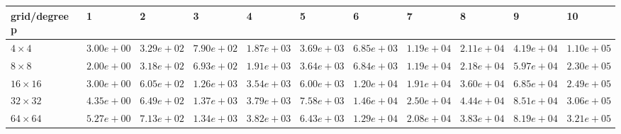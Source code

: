 \begin{tabular}{lllllllllll}
\hline
 grid/degree p   & 1          & 2          & 3          & 4          & 5          & 6          & 7          & 8          & 9          & 10         \\
\hline
 $4 \times 4$    & $3.00e+00$ & $3.29e+02$ & $7.90e+02$ & $1.87e+03$ & $3.69e+03$ & $6.85e+03$ & $1.19e+04$ & $2.11e+04$ & $4.19e+04$ & $1.10e+05$ \\
 $8 \times 8$    & $2.00e+00$ & $3.18e+02$ & $6.93e+02$ & $1.91e+03$ & $3.64e+03$ & $6.84e+03$ & $1.19e+04$ & $2.18e+04$ & $5.97e+04$ & $2.30e+05$ \\
 $16 \times 16$  & $3.00e+00$ & $6.05e+02$ & $1.26e+03$ & $3.54e+03$ & $6.00e+03$ & $1.20e+04$ & $1.91e+04$ & $3.60e+04$ & $6.85e+04$ & $2.49e+05$ \\
 $32 \times 32$  & $4.35e+00$ & $6.49e+02$ & $1.37e+03$ & $3.79e+03$ & $7.58e+03$ & $1.46e+04$ & $2.50e+04$ & $4.44e+04$ & $8.51e+04$ & $3.06e+05$ \\
 $64 \times 64$  & $5.27e+00$ & $7.13e+02$ & $1.34e+03$ & $3.82e+03$ & $6.43e+03$ & $1.29e+04$ & $2.08e+04$ & $3.83e+04$ & $8.19e+04$ & $3.21e+05$ \\
\hline
\end{tabular}